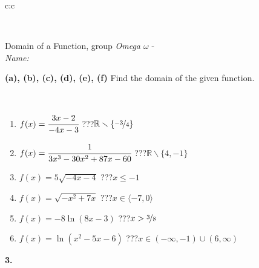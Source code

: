 \documentclass[10pt]{report}
\begin{document}
\begin{tabular}{c:c}
\begin{minipage}[c][104.5mm][t]{0.5\linewidth}
\begin{center}
\begin{minipage}{0.20\linewidth}
\end{minipage}
\end{center}
\end{minipage}
\\ \hdashline
\begin{minipage}[c][104.5mm][t]{0.5\linewidth}
\begin{center}
\vspace{7mm}
{\huge Domain of a Function, group \textit{Omega $\omega$} -}\\[5mm]
\textit{Name:}\phantom{xxxxxxxxxxxxxxxxxxxxxxxxxxxxxxxxxxxxxxxxxxxxxxxxxxxxxxxxxxxxxxxxx}\\[5mm]
\begin{minipage}{0.95\linewidth}
\begin{center}
{
\textbf{(a), (b), (c), (d), (e), (f)} Find the domain of the given function. \\[1mm]
\phantom{x}
}
\end{center}
\end{minipage}
\\[4mm]
\begin{minipage}{0.79\linewidth}
\begin{center}
\begin{varwidth}{\linewidth}
\begin{enumerate}
\normalsizerrr
\item $f(x)=\cfrac{3x-2}{-4x-3}$\quad \dotfill\; ???\;\dotfill \quad $ \mathbb{R} \smallsetminus\{\nicefrac{-3}{4} \}$
\item $f(x)=\cfrac{1}{3x^3-30x^2+87x-60}$\quad \dotfill\; ???\;\dotfill \quad $ \mathbb{R} \smallsetminus\{4,-1 \}$
\item $f(x)=5\sqrt{-4x-4}$\quad \dotfill\; ???\;\dotfill \quad $x\leq-1$
\item $f(x)=\sqrt{-x^2+7x}$\quad \dotfill\; ???\;\dotfill \quad $x\in\langle-7 , 0\rangle$
\item $f(x)=-8\ln{(8x-3)}$\quad \dotfill\; ???\;\dotfill \quad $x>\nicefrac{3}{8}$
\item $f(x)=\ln{(x^2-5x-6)}$\quad \dotfill\; ???\;\dotfill \quad $x\in(-\infty , -1)\cup(6 , \infty)$
\end{enumerate}
\end{varwidth}
\end{center}
\end{minipage}
\begin{minipage}{0.20\linewidth}
\begin{center}
{\Huge\bfseries 3.} \\[2mm]

\end{center}
\end{minipage}
\end{center}
\end{minipage}
\end{tabular}
\end{document}
